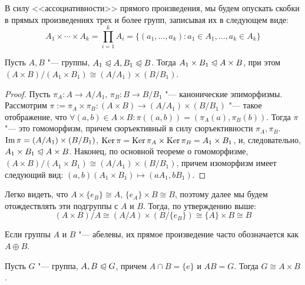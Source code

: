 \begin{note}
	В силу <<ассоциативности>> прямого произведения, мы будем опускать скобки в прямых произведениях трех и более групп, записывая их в следующем виде:
	\[A_1 \times \cdots \times A_k = \prod_{i = 1}^kA_i = \{(a_1, \ldots, a_k): a_1 \in A_1, \ldots, a_k \in A_k\}\]
\end{note}

\begin{proposition}
	Пусть $A, B$ "--- группы, $A_1 \trianglelefteqslant A, B_1 \trianglelefteqslant B$. Тогда $A_1 \times B_1 \trianglelefteqslant A \times B$, при этом $(A \times B) / (A_1 \times B_1) \cong (A / A_1) \times (B / B_1)$.
\end{proposition}

\begin{proof}
	Пусть $\pi_A: A \to A/A_1$, $\pi_B: B \to B/B_1$ "--- канонические эпиморфизмы. Рассмотрим $\pi := \pi_A \times \pi_B: (A \times B) \to (A / A_1) \times (B / B_1)$ "--- такое отображение, что $\forall (a, b) \in A \times B: \pi((a, b)) = (\pi_A(a), \pi_B(b))$. Тогда $\pi$ "--- это гомоморфизм, причем сюръективный в силу сюръективности $\pi_A, \pi_B$. $\operatorname{Im}\pi = (A / A_1) \times (B / B_1)$, $\operatorname{Ker}\pi = \operatorname{Ker}\pi_A \times \operatorname{Ker}\pi_B = A_1 \times B_1$, и, следовательно, $A_1 \times B_1 \trianglelefteqslant A \times B$. Наконец, по основной теореме о гомоморфизме, $(A \times B) / (A_1 \times B_1) \cong (A / A_1) \times (B / B_1)$, причем изоморфизм имеет следующий вид: $(a, b)(A_1 \times B_1) \mapsto (aA_1, bB_1)$.
\end{proof}

\begin{note}
	Легко видеть, что $A \times \{e_B\} \cong A$, $\{e_A\} \times B \cong B$, поэтому далее мы будем отождествлять эти подгруппы с $A$ и $B$. Тогда, по утверждению выше:
	\[(A \times B)/A \cong (A / A) \times (B / \{e_B\}) \cong \{A\} \times B \cong B\]
\end{note}

\begin{note}
	Если группы $A$ и $B$ "--- абелевы, их прямое произведение часто обозначается как $A \oplus B$.
\end{note}

\begin{theorem}
	Пусть $G$ "--- группа, $A, B \trianglelefteqslant G$, причем $A \cap B = \{e\}$ и $AB = G$. Тогда $G \cong A \times B$.
\end{theorem}

